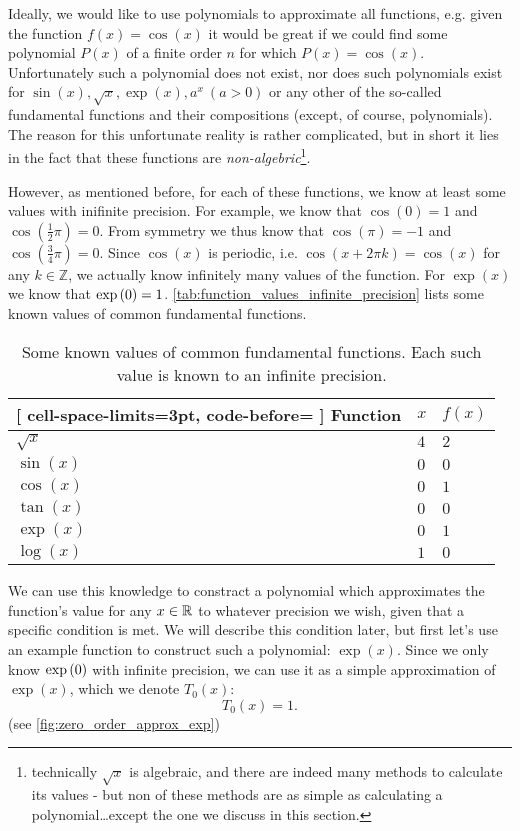 Ideally, we would like to use polynomials to approximate all functions, e.g. given the function $f(x) = \cos(x)$ it would be great if we could find some polynomial $P(x)$ of a finite order $n$ for which $P(x)=\cos(x)$. Unfortunately such a polynomial does not exist, nor does such polynomials exist for $\sin(x), \sqrt{x}, \exp(x), a^{x}\ \left(a>0\right)$ or any other of the so-called fundamental functions and their compositions (except, of course, polynomials). The reason for this unfortunate reality is rather complicated, but in short it lies in the fact that these functions are \textit{non-algebric}\footnote{technically $\sqrt{x}$ is algebraic, and there are indeed many methods to calculate its values - but non of these methods are as simple as calculating a polynomial\dots except the one we discuss in this section.}.

However, as mentioned before, for each of these functions, we know at least some values with inifinite precision. For example, we know that $\cos(0)=1$ and $\cos\left(\frac{1}{2}\pi\right)=0$. From symmetry we thus know that $\cos(\pi)=-1$ and $\cos\left(\frac{3}{4}\pi\right)=0$. Since $\cos(x)$ is periodic, i.e. $\cos\left(x+2\pi k\right)=\cos(x)$ for any $k\in\mathbb{Z}$, we actually know infinitely many values of the function. For $\exp(x)$ we know that $\exp\left(0\right)=1$. \autoref{tab:function_values_infinite_precision} lists some known values of common fundamental functions.

\begin{table}[htpb]
	\centering
	\caption{Some known values of common fundamental functions. Each such value is known to an infinite precision.}
	\label{tab:function_values_infinite_precision}
	\begin{NiceTabular}{lll}[
			cell-space-limits=3pt, code-before= 
		]
		\toprule
		\RowStyle{\bfseries} Function & $x$ & $f(x)$\\
		\midrule
    $\sqrt{x}$ & $4$ & $2$\\
    $\sin(x)$ & $0$ & $0$\\
    $\cos(x)$ & $0$ & $1$\\
    $\tan(x)$ & $0$ & $0$\\
    $\exp(x)$ & $0$ & $1$\\
    $\log(x)$ & $1$ & $0$\\
		\bottomrule
	\end{NiceTabular}
\end{table}

We can use this knowledge to constract a polynomial which approximates the function's value for any $x\in\mathbb{R}^{}$ to whatever precision we wish, given that a specific condition is met. We will describe this condition later, but first let's use an example function to construct such a polynomial: $\exp(x)$. Since we only know $\exp\left(0\right)$ with infinite precision, we can use it as a simple approximation of $\exp(x)$, which we denote $T_{0}(x)$:
\begin{equation}
  T_{0}(x) = 1.
  \label{eq:zero_order_approx_exp}
\end{equation}
(see \autoref{fig:zero_order_approx_exp})

